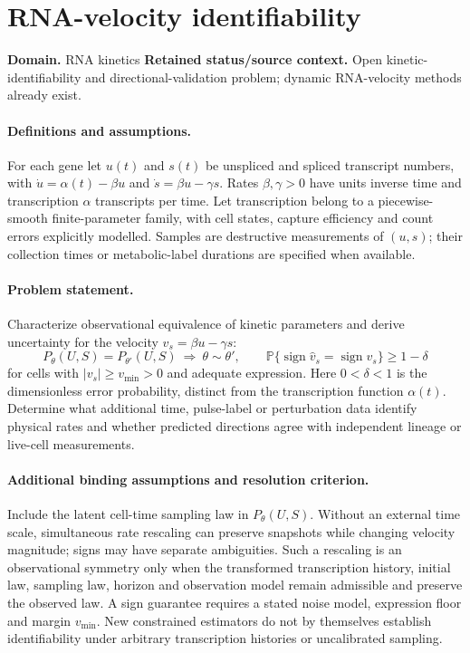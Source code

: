 \documentclass[11pt]{article}
\begin{document}
\section*{RNA-velocity identifiability}
\label{prob:072}
\label{rank:225}
\par\smallskip

\noindent\textbf{Domain.} RNA kinetics \quad \textbf{Retained status/source context.} Open kinetic-identifiability and directional-validation problem; dynamic RNA-velocity methods already exist.
\paragraph{Definitions and assumptions.} For each gene let $u(t)$ and $s(t)$ be unspliced and spliced transcript numbers, with $\dot u=\alpha(t)-\beta u$ and $\dot s=\beta u-\gamma s$. Rates $\beta,\gamma>0$ have units inverse time and transcription $\alpha$ transcripts per time. Let transcription belong to a piecewise-smooth finite-parameter family, with cell states, capture efficiency and count errors explicitly modelled. Samples are destructive measurements of $(u,s)$; their collection times or metabolic-label durations are specified when available.
\paragraph{Problem statement.} Characterize observational equivalence of kinetic parameters and derive uncertainty for the velocity $v_s=\beta u-\gamma s$:
\[P_\theta(U,S)=P_{\theta'}(U,S)\ \Longrightarrow\ \theta\sim\theta',\qquad \mathbb{P}\{\operatorname{sign}\widehat v_s=\operatorname{sign}v_s\}\ge1-\delta\]
for cells with $|v_s|\ge v_{\min}>0$ and adequate expression. Here $0<\delta<1$ is the dimensionless error probability, distinct from the transcription function $\alpha(t)$. Determine what additional time, pulse-label or perturbation data identify physical rates and whether predicted directions agree with independent lineage or live-cell measurements.
\paragraph{Additional binding assumptions and resolution criterion.} Include the latent cell-time sampling law in $P_\theta(U,S)$. Without an external time scale, simultaneous rate rescaling can preserve snapshots while changing velocity magnitude; signs may have separate ambiguities. Such a rescaling is an observational symmetry only when the transformed transcription history, initial law, sampling law, horizon and observation model remain admissible and preserve the observed law. A sign guarantee requires a stated noise model, expression floor and margin $v_{\min}$. New constrained estimators do not by themselves establish identifiability under arbitrary transcription histories or uncalibrated sampling.
\end{document}
